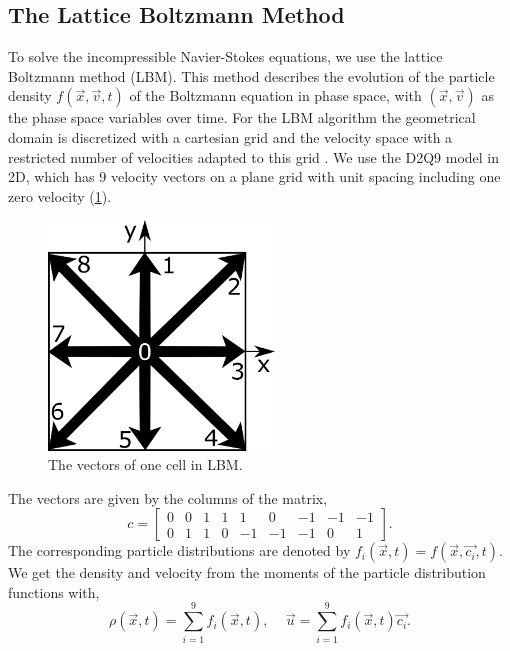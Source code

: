 \documentclass[final,leqno,onefignum,onetabnum]{siamltexmm}
\begin{document}
\subsection{The Lattice Boltzmann Method}
To solve the incompressible Navier-Stokes equations, we use the lattice Boltzmann method (LBM). This method describes the evolution of the particle density $f(\vec{x},\vec{v},t)$ of the Boltzmann equation in phase space, with $(\vec{x},\vec{v})$ as the phase space variables over time. For the LBM algorithm the geometrical domain is discretized with a cartesian grid and the velocity space with a restricted number of velocities adapted to this grid \cite{LBM1,LBM2,LBM3,LBM4}. We use the D2Q9 model in 2D, which has 9 velocity vectors on a plane grid with unit spacing including one zero velocity (\cref{lbmc_i}). 
\begin{figure}
	\hfill\includegraphics[width=6cm,natwidth=403,natheight=409]{LBMc_i.png}\hspace*{\fill}
	\caption{The vectors of one cell in LBM.}
	\label{lbmc_i}
\end{figure}
The vectors are given by the columns of the matrix,
\begin{equation}
	c = 
	\begin{bmatrix}
	0 & 0 & 1 & 1 &  1 &  0 & -1 & -1 & -1 \\
	0 & 1 & 1 & 0 & -1 & -1 & -1 &  0 &  1
	\end{bmatrix}
	\text{.}
  \label{disc_vel}
\end{equation}
The corresponding particle distributions are denoted by $f_i(\vec{x},t) = f(\vec{x},\vec{c_i},t)$. We get the density and velocity from the moments of the particle distribution functions with,
\begin{equation}
	\rho(\vec{x},t) = \sum_{i=1}^{9} f_i(\vec{x},t) \text{, } \quad
	\vec{u} = \sum_{i=1}^{9} f_i(\vec{x},t)\vec{c_i} \text{.}
\end{equation}
\end{document}
